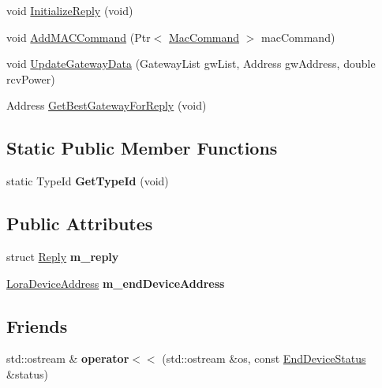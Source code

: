 \begin{DoxyCompactItemize}
void \hyperlink{classns3_1_1lorawan_1_1EndDeviceStatus_a9d25dab867d40f0ef85881527d3467e8}{Initialize\+Reply} (void)
\item 
void \hyperlink{classns3_1_1lorawan_1_1EndDeviceStatus_ab9a84efe386e3677ecf9c817ba936dda}{Add\+M\+A\+C\+Command} (Ptr$<$ \hyperlink{classns3_1_1lorawan_1_1MacCommand}{Mac\+Command} $>$ mac\+Command)
\item 
void \hyperlink{classns3_1_1lorawan_1_1EndDeviceStatus_a1cd60fc88eb88c1990f28e8aee71e05f}{Update\+Gateway\+Data} (Gateway\+List gw\+List, Address gw\+Address, double rcv\+Power)
\item 
Address \hyperlink{classns3_1_1lorawan_1_1EndDeviceStatus_a08f78817278989d57c515af97b9b9204}{Get\+Best\+Gateway\+For\+Reply} (void)
\end{DoxyCompactItemize}
\subsection*{Static Public Member Functions}
\begin{DoxyCompactItemize}
\item 
\mbox{\label{classns3_1_1lorawan_1_1EndDeviceStatus_af8792a24e34cc46530849ebcaa9896e1}} 
static Type\+Id {\bfseries Get\+Type\+Id} (void)
\end{DoxyCompactItemize}
\subsection*{Public Attributes}
\begin{DoxyCompactItemize}
\item 
\mbox{\label{classns3_1_1lorawan_1_1EndDeviceStatus_a5ff004b81ff7c6d555bbe670c42bec0b}} 
struct \hyperlink{structns3_1_1lorawan_1_1EndDeviceStatus_1_1Reply}{Reply} {\bfseries m\+\_\+reply}
\item 
\mbox{\label{classns3_1_1lorawan_1_1EndDeviceStatus_a60b7ba4fdaf30e9824f355beca66c617}} 
\hyperlink{classns3_1_1lorawan_1_1LoraDeviceAddress}{Lora\+Device\+Address} {\bfseries m\+\_\+end\+Device\+Address}
\end{DoxyCompactItemize}
\subsection*{Friends}
\begin{DoxyCompactItemize}
\item 
\mbox{\label{classns3_1_1lorawan_1_1EndDeviceStatus_a8b9f34fb2bce772f0a8887243ded0977}} 
std\+::ostream \& {\bfseries operator$<$$<$} (std\+::ostream \&os, const \hyperlink{classns3_1_1lorawan_1_1EndDeviceStatus}{End\+Device\+Status} \&status)
\end{DoxyCompactItemize}


